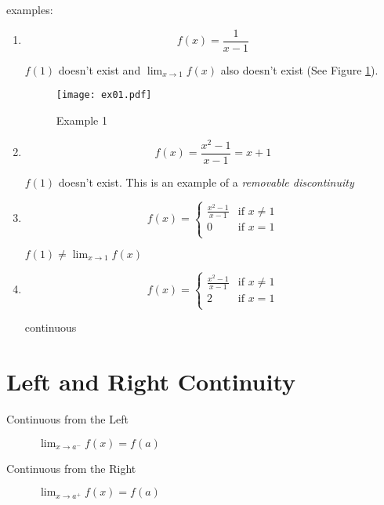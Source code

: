 \documentclass[letterpaper, landscape]{exam}
\begin{document}
  examples:
  \begin{enumerate}
    \item 
      \[
        f(x) = \frac{1}{x - 1}
      \]
      
      $f(1)$ doesn't exist and $\lim_{x \to 1} f(x)$ also doesn't exist (See Figure
      \ref{fig:ex01}).

      \begin{figure}[H]
        \centering
        \texttt{[image: ex01.pdf]}
        \caption{Example 1}
        \label{fig:ex01}
      \end{figure}

    \item 
      \[
        f(x) = \frac{x^2 - 1}{x - 1} = x + 1
      \]
      
      $f(1)$ doesn't exist. This is an example of a {\em removable discontinuity}

    \item
        \[
          f(x) = 
            \begin{cases}
              \frac{x^2 - 1}{x - 1} & \text{if } x \neq 1 \\
              0                     & \text{if } x = 1 \\
            \end{cases}
        \]

        $f(1) \neq\lim_{x \to 1} f(x)$

    \item
        \[
          f(x) = 
            \begin{cases}
              \frac{x^2 - 1}{x - 1} & \text{if } x \neq 1 \\
              2                     & \text{if } x = 1 \\
            \end{cases}
        \]

        continuous

  \end{enumerate}

  \section{Left and Right Continuity}
  
  \begin{description}
    \item[Continuous from the Left] $\lim_{x \to a^-} f(x) = f(a)$ 
    \item[Continuous from the Right] $\lim_{x \to a^+} f(x) = f(a)$ 
  \end{description}
\end{document}
